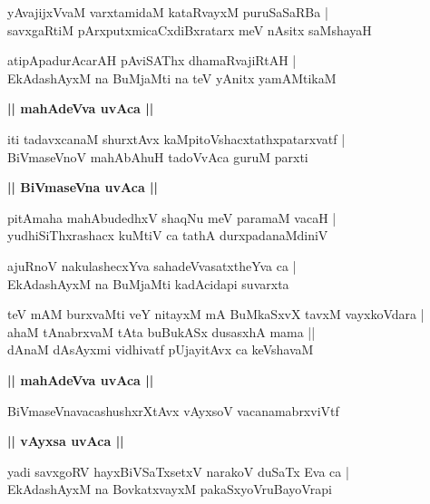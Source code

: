 \documentclass[twoside,12pt,openright]{book}
\newcounter{shloka}[chapter]
\def\uvaca#1{\centerline{{\large\textbf{#1}}}}
\begin{document}
\begin{shloka}%
yAvajijxVvaM varxtamidaM kataRvayxM puruSaSaRBa |\\
savxgaRtiM pArxputxmicaCxdiBxratarx meV nAsitx saMshayaH 
\end{shloka}

\begin{shloka}%
atipApadurAcarAH pAviSAThx dhamaRvajiRtAH |\\
EkAdashAyxM na BuMjaMti na teV yAnitx yamAMtikaM
\end{shloka}

\uvaca{|| mahAdeVva uvAca ||}

\begin{shloka}%
iti tadavxcanaM shurxtAvx kaMpitoVshacxtathxpatarxvatf |\\
BiVmaseVnoV mahAbAhuH tadoVvAca guruM parxti 
\end{shloka}

\uvaca{|| BiVmaseVna uvAca ||}

\begin{shloka}%
pitAmaha mahAbudedhxV shaqNu meV paramaM vacaH |\\
yudhiSiThxrashacx kuMtiV ca tathA durxpadanaMdiniV 
\end{shloka}

\begin{shloka}%
ajuRnoV nakulashecxYva sahadeVvasatxtheYva ca |\\
EkAdashAyxM na BuMjaMti kadAcidapi suvarxta
\end{shloka}

\begin{shloka}%
teV mAM burxvaMti veY nitayxM mA BuMkaSxvX tavxM vayxkoVdara |\\
ahaM tAnabrxvaM tAta buBukASx dusasxhA mama ||\\
dAnaM dAsAyxmi vidhivatf pUjayitAvx ca keVshavaM 
\end{shloka}

\uvaca{|| mahAdeVva uvAca ||}

\begin{shloka}%
BiVmaseVnavacashushxrXtAvx vAyxsoV vacanamabrxviVtf
\end{shloka}

\uvaca{|| vAyxsa uvAca ||}

\begin{shloka}%
yadi savxgoRV hayxBiVSaTxsetxV narakoV duSaTx Eva ca |\\
EkAdashAyxM na BovkatxvayxM pakaSxyoVruBayoVrapi
\end{shloka}
\end{document}
